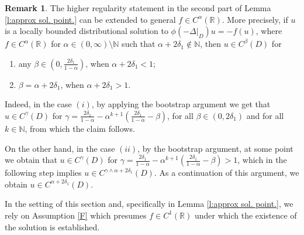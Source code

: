 \documentclass[12pt,a4paper,onecolumn]{amsart}
\theoremstyle{definition}
\newtheorem{rem}[thm]{Remark}
\newcommand{\R}{\mathbb{R}}
\newcommand{\N}{\mathbb{N}}
\newcommand{\1}{\mathbf 1}
\newcommand{\Lo}{\phi(-\left.\Delta\right\vert_{D})}
\numberwithin{equation}{section}
\begin{document}
{
\begin{rem}
    The higher regularity statement in the second part of Lemma \ref{l:approx sol. point.} can be extended to general $f\in C^\alpha(\R)$.  More precisely, if $u$ is a locally bounded distributional solution to $\Lo u=-f(u)$, where $f\in C^\alpha(\R)$ for $\alpha\in (0,\infty)\setminus \N$ such that $\alpha+2\delta_1\notin \N$, then $u\in C^\beta(D)$ for 
    \begin{enumerate}[$(i)$]
        \item any $\beta\in\left(0,\frac{2\delta_1}{1-\alpha}\right)$, when $\alpha+2\delta_1<1$;
        \item $\beta=\alpha+2\delta_1$, when $\alpha+2\delta_1>1$.
    \end{enumerate}
    Indeed, in the case $(i)$, by applying the bootstrap argument we get that $u\in C^\gamma(D)$ for $\gamma=\frac{2 \delta_1}{1-\alpha}-\alpha^{k+1}(\frac{2\delta_1}{1-\alpha}-\beta)$, for all $\beta\in(0,2\delta_1)$ and for all $k\in \N$, from which the claim follows. 

    On the other hand, in the case $(ii)$, by the bootstrap argument, at some point we obtain that $u\in C^\gamma(D)$ for $\gamma=\frac{2 \delta_1}{1-\alpha}-\alpha^{k+1}(\frac{2\delta_1}{1-\alpha}-\beta)>1$, which in the following step implies $u\in C^{\gamma\wedge \alpha+2\delta_1}(D)$. As a continuation of this argument, we obtain $u\in C^{ \alpha+2\delta_1}(D)$.
    
In the setting of this section and, specifically in Lemma \ref{l:approx sol. point.}, we rely on Assumption \ref{F} which presumes $f\in C^1(\R)$ under which the existence of the solution is established.
\end{rem}
}
\end{document}
